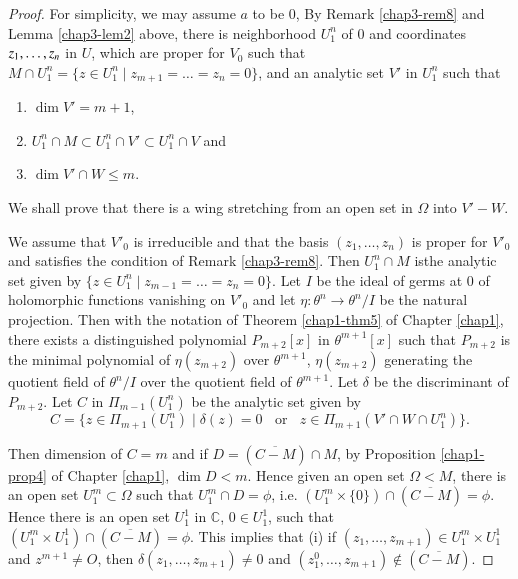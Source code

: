 \begin{proof} %
  For simplicity, we may assume $a$ to be $0$, By Remark
  \ref{chap3-rem8} and Lemma \ref{chap3-lem2} 
   above, there is neighborhood $U^{n}_{1}$ of $0$ and coordinates
  $z_{1}, \ldots ,\break z_{n}$ in $U$, which are proper for $V_{0}$
  such that 
  $M \cap U^{n}_{1} = \{z \in U^{n}_{1} \mid z_{m+1} = \ldots =
  z_{n} = 0\}$, and an analytic set $V'$ in $U^{n}_{1}$ such that 
\begin{enumerate}[(1)]
\item  $\dim V' = m+1$, 
\item $U^{n}_{1} \cap M \subset U^{n}_{1} \cap V'
  \subset U^{n}_{1} \cap V$ and 
\item $\dim V' \cap W \leq m$. 
\end{enumerate}

We shall prove that there is a wing stretching from an open set in
  $\Omega$ into $V' - W$. 

We assume that $V'_{0}$ is irreducible and that the basis
$(z_1 , \ldots , z_n)$ is proper for $V'_{0}$ and satisfies the
condition of Remark \ref{chap3-rem8}. Then $U^{n}_{1} \cap M$ 
is\pageoriginale the analytic set
given by $\{z \in U^n_1 \mid z_{m-1} =\ldots= z_n =
0\}$. Let $I$ be the ideal of germs at $0$ of holomorphic functions
vanishing on $V'_0$ and let $\eta: \theta^n \to \theta^{n}/I$ 
be the natural projection. Then with the notation of Theorem \ref{chap1-thm5}
of Chapter \ref{chap1}, there exists a distinguished polynomial $P_{m+2}[x]$ in
$\theta^{m+1}[x]$ such that $P_{m+2}$ is the minimal polynomial of
$\eta(z_{m+2})$ over $\theta^{m+1}$, $\eta(z_{m+2})$ generating the
quotient field of $\theta^{n}/I$ over the quotient field of
$\theta^{m+1}$. Let $\delta$ be the discriminant of $P_{m+2}$. Let $C$
in $\Pi_{m-1}(U^n_1)$ be the analytic set given by 
$$
C=\Bigg\{z\in
\Pi_{m+1}(U^n_1)\mid \delta (z) = 0 ~\text{~ or~ }~ z\in \Pi_{m+1}(V'\cap W
\cap U^n_1)\Bigg\}.
$$ 

Then dimension of $C = m$ and if $D =
(\overline{C-M}) \cap M$, by Proposition \ref{chap1-prop4} of Chapter
\ref{chap1}, $\dim D < m$. Hence given an open set $\Omega < M$, there
is an open set $U^m_1 \subset \Omega$ such that $U^m_1 \cap D = \phi$,
i.e. $(U^m_1 \times 
\{0\}) \cap (\overline{C-M}) = \phi$. Hence there is an open set
$U^1_1$ in  $\mathbb{C}$, $0 \in U^1_1$, such that $(U^m_1
\times U^1_1)\cap (\overline{C-M}) = \phi$. This implies that (i)
if $(z_1,\ldots,z_{m+1})\in U^m_1 \times U^1_1$ and $z^{m+1} \neq
O$, then $\delta(z_1,\ldots,z_{m+1})\neq 0$ and
$(z_1^{0},\ldots,z_{m+1}) \notin (\overline{C-M})$.  


\end{proof}
